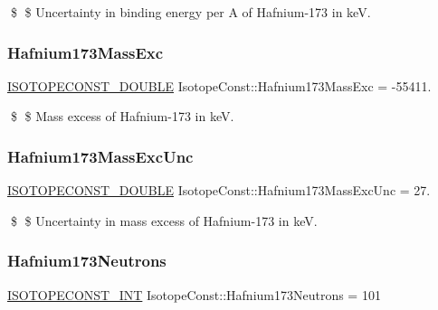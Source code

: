 \$ \$ Uncertainty in binding energy per A of Hafnium-\/173 in keV. \mbox{\label{group___isotope_const-_hafnium-_hf173_gabb5885f7f69949d3a36cf7ebc288c887}} 
\subsubsection{\texorpdfstring{Hafnium173\+Mass\+Exc}{Hafnium173MassExc}}
{\footnotesize\ttfamily \mbox{\hyperlink{group___isotope_const-_macros_ga8f45a7272ce02c0b4c65c44636ed719a}{I\+S\+O\+T\+O\+P\+E\+C\+O\+N\+S\+T\+\_\+\+D\+O\+U\+B\+LE}} Isotope\+Const\+::\+Hafnium173\+Mass\+Exc = -\/55411.}

\$ \$ Mass excess of Hafnium-\/173 in keV. \mbox{\label{group___isotope_const-_hafnium-_hf173_gaff8fb36eb357dd83990485451297b2e7}} 
\subsubsection{\texorpdfstring{Hafnium173\+Mass\+Exc\+Unc}{Hafnium173MassExcUnc}}
{\footnotesize\ttfamily \mbox{\hyperlink{group___isotope_const-_macros_ga8f45a7272ce02c0b4c65c44636ed719a}{I\+S\+O\+T\+O\+P\+E\+C\+O\+N\+S\+T\+\_\+\+D\+O\+U\+B\+LE}} Isotope\+Const\+::\+Hafnium173\+Mass\+Exc\+Unc = 27.}

\$ \$ Uncertainty in mass excess of Hafnium-\/173 in keV. \mbox{\label{group___isotope_const-_hafnium-_hf173_gaf298d0a465ba79ec18ea5632b349b0dc}} 
\subsubsection{\texorpdfstring{Hafnium173\+Neutrons}{Hafnium173Neutrons}}
{\footnotesize\ttfamily \mbox{\hyperlink{group___isotope_const-_macros_ga5f18360b3e99483a35c32d789e62621c}{I\+S\+O\+T\+O\+P\+E\+C\+O\+N\+S\+T\+\_\+\+I\+NT}} Isotope\+Const\+::\+Hafnium173\+Neutrons = 101}

